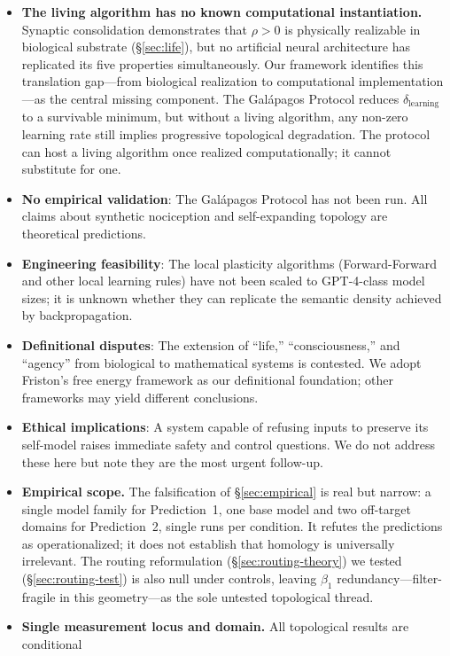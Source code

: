 \documentclass{article}
\begin{document}
\begin{itemize}
    \item \textbf{The living algorithm has no known computational instantiation.} Synaptic consolidation demonstrates that $\rho > 0$ is physically realizable in biological substrate (\S\ref{sec:life}), but no artificial neural architecture has replicated its five properties simultaneously. Our framework identifies this translation gap---from biological realization to computational implementation---as the central missing component. The Galápagos Protocol reduces $\delta_{\text{learning}}$ to a survivable minimum, but without a living algorithm, any non-zero learning rate still implies progressive topological degradation. The protocol can host a living algorithm once realized computationally; it cannot substitute for one.
    \item \textbf{No empirical validation}: The Galápagos Protocol has not been run. All claims about synthetic nociception and self-expanding topology are theoretical predictions.
    \item \textbf{Engineering feasibility}: The local plasticity algorithms (Forward-Forward and other local learning rules) have not been scaled to GPT-4-class model sizes; it is unknown whether they can replicate the semantic density achieved by backpropagation.
    \item \textbf{Definitional disputes}: The extension of ``life,'' ``consciousness,'' and ``agency'' from biological to mathematical systems is contested. We adopt Friston's free energy framework as our definitional foundation; other frameworks may yield different conclusions.
    \item \textbf{Ethical implications}: A system capable of refusing inputs to preserve its self-model raises immediate safety and control questions. We do not address these here but note they are the most urgent follow-up.
    \item \textbf{Empirical scope.} The falsification of \S\ref{sec:empirical} is real but narrow: a single model family for Prediction~1, one base model and two off-target domains for Prediction~2, single runs per condition. It refutes the predictions as operationalized; it does not establish that homology is universally irrelevant. The routing reformulation (\S\ref{sec:routing-theory}) we tested (\S\ref{sec:routing-test}) is also null under controls, leaving $\beta_1$ redundancy---filter-fragile in this geometry---as the sole untested topological thread.
    \item \textbf{Single measurement locus and domain.} All topological results are conditional

\end{itemize}
\end{document}
